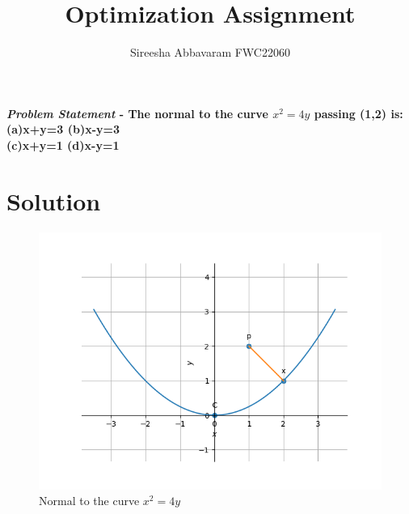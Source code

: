 \documentclass[journal,10pt,twocolumn]{article}
\title{\textbf{Optimization Assignment}}
\author{Sireesha Abbavaram \hspace{9cm} FWC22060}
\begin{document}
\maketitle
\paragraph{\textit{Problem Statement} - The normal to the curve \(x^2=4y\) passing (1,2) is:\\
(a)x+y=3  \hspace{2cm} (b)x-y=3\\ 
(c)x+y=1 \hspace{2cm}  (d)x-y=1\\}

\section*{\large Solution}

\begin{figure}[H]
\centering
\includegraphics[width=1\columnwidth]{opt.png}
\caption{Normal to the curve $x^2=4y$}
\end{figure}
\end{document}
